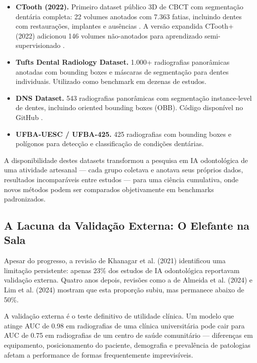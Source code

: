 \begin{itemize}
    \item \textbf{CTooth (2022).} Primeiro dataset público 3D de CBCT com segmentação dentária completa: 22 volumes anotados com 7.363 fatias, incluindo dentes com restaurações, implantes e ausências \cite{ODT-030}. A versão expandida CTooth+ (2022) adicionou 146 volumes não-anotados para aprendizado semi-supervisionado \cite{ODT-031}.
    \item \textbf{Tufts Dental Radiology Dataset.} 1.000+ radiografias panorâmicas anotadas com bounding boxes e máscaras de segmentação para dentes individuais. Utilizado como benchmark em dezenas de estudos.
    \item \textbf{DNS Dataset.} 543 radiografias panorâmicas com segmentação instance-level de dentes, incluindo oriented bounding boxes (OBB). Código disponível no GitHub \cite{DL-ODT-007}.
    \item \textbf{UFBA-UESC / UFBA-425.} 425 radiografias com bounding boxes e polígonos para detecção e classificação de condições dentárias.
\end{itemize}

A disponibilidade destes datasets transformou a pesquisa em IA odontológica de uma atividade artesanal — cada grupo coletava e anotava seus próprios dados, resultados incomparáveis entre estudos — para uma ciência cumulativa, onde novos métodos podem ser comparados objetivamente em benchmarks padronizados.

\subsection{A Lacuna da Validação Externa: O Elefante na Sala}

Apesar do progresso, a revisão de Khanagar et al. (2021) \cite{ODT-001} identificou uma limitação persistente: apenas 23\% dos estudos de IA odontológica reportavam validação externa. Quatro anos depois, revisões como a de Almeida et al. (2024) \cite{ODT-020} e Lim et al. (2024) \cite{ODT-012} mostram que esta proporção subiu, mas permanece abaixo de 50\%.

A validação externa é o teste definitivo de utilidade clínica. Um modelo que atinge AUC de 0.98 em radiografias de uma clínica universitária pode cair para AUC de 0.75 em radiografias de um centro de saúde comunitário — diferenças em equipamento, posicionamento do paciente, demografia e prevalência de patologias afetam a performance de formas frequentemente imprevisíveis.

